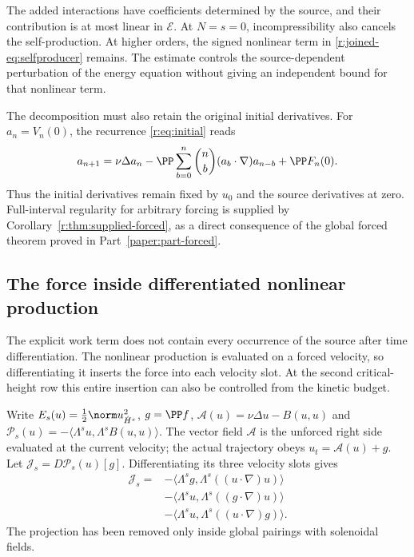The added interactions have coefficients determined by the source,
and their contribution is at most linear in \(\mathscr E\).
At \(N=s=0\), incompressibility also cancels the self-production.
At higher orders, the signed nonlinear term in
\eqref{r:joined-eq:selfproducer} remains. The estimate controls the
source-dependent perturbation of the energy equation without giving
an independent bound for that nonlinear term.

The decomposition must also retain the original initial derivatives.
For \(a_n=V_n(0)\), the recurrence \eqref{r:eq:initial} reads
\begin{equation}\label{r:joined-eq:initialjet}
a_{n+1}=\nu\Delta a_n
-\PP\sum_{b=0}^{n}\binom nb(a_b\cdot\nabla)a_{n-b}
+\PP F_n(0).
\end{equation}
Thus the initial derivatives remain fixed by \(u_0\) and the
source derivatives at zero. Full-interval regularity for arbitrary
forcing is supplied by Corollary~\ref{r:thm:supplied-forced}, as a direct
consequence of the global forced theorem proved in Part~\ref{paper:part-forced}.


\subsection{The force inside differentiated nonlinear production}

The explicit work term does not contain every occurrence of the source after time differentiation. The nonlinear production is evaluated on a forced velocity, so differentiating it inserts the force into each velocity slot. At the second critical-height row this entire insertion can also be controlled from the kinetic budget.

Write $E_s(u)=\frac12\norm u_{\dot H^s}^2$, $g=\PP f$,
$\mathcal A(u)=\nu\Delta u-B(u,u)$ and
$\mathcal P_s(u)=-\langle\Lambda^su,\Lambda^sB(u,u)\rangle$.
The vector field $\mathcal A$ is the unforced right side evaluated at the current velocity; the actual trajectory obeys $u_t=\mathcal A(u)+g$.
Let $\mathcal J_s=D\mathcal P_s(u)[g]$. Differentiating its three velocity slots gives
\begin{equation}\label{r:joined-eq:sourceinsertion}
\begin{aligned}
\mathcal J_s={}&-\langle\Lambda^sg,\Lambda^s((u\cdot\nabla)u)\rangle\\
&-\langle\Lambda^su,\Lambda^s((g\cdot\nabla)u)\rangle\\
&-\langle\Lambda^su,\Lambda^s((u\cdot\nabla)g)\rangle .
\end{aligned}
\end{equation}
The projection has been removed only inside global pairings with solenoidal fields.

